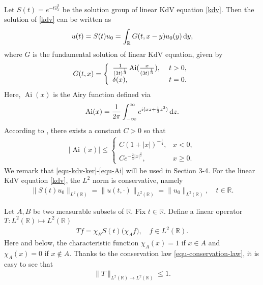 \documentclass[preprint,12pt]{elsarticle}
\def\R {\mathbb{R}}
\def\d{{\,\rm d}}
\begin{document}
Let $S(t)=e^{-t\partial_x^3}$ be the solution group of linear KdV equation \eqref{kdv}. Then the solution of  \eqref{kdv} can be written as
\begin{align}\label{equ-kdv-solu}
u(t)=S(t)u_0=\int_\R G(t,x-y)u_0(y)\d y,
\end{align}
where $G$ is the fundamental solution of linear KdV equation, given by
\begin{align}\label{equ-kdv-ker}
    G(t,x)= \left\{
        \begin{array}{ll}
        \frac{1}{(3t)^{\frac{1}{3}}}\operatorname{Ai}(\frac{x}{(3t)^{\frac{1}{3}}}), & \hbox{ }t> 0, \\
        \delta(x), & \hbox{ }t=0.
        \end{array}
        \right.
\end{align}
Here, $\operatorname{Ai}(x)$ is the Airy function defined via
\begin{align*}
\operatorname{Ai}(x)= \frac{1}{2\pi}\int^{\infty}_{-\infty}e^{i(xz+\frac{1}{3}z^3)}\d z.
\end{align*}
According to \cite[p.330]{stein}, there exists a constant $C>0$ so that
\begin{align}\label{equ-Ai}
|\operatorname{Ai}(x)| \leq
\left\{
\begin{array}{ll}
C(1+|x|)^{-\frac{1}{4}}, &   x<0, \\
 Ce^{-\frac{2}{3}|x|^{\frac{3}{2}}}, &  x\geq 0.
\end{array}
\right.
\end{align}
We remark that \eqref{equ-kdv-ker}-\eqref{equ-Ai} will be used in Section 3-4. For the linear KdV equation \eqref{kdv}, the $L^2$ norm is conservative, namely
\begin{align}\label{equ-conservation-law}
\|S(t)u_0\|_{L^2(\R)}=\|u(t,\cdot)\|_{L^2(\R)}=\|u_0\|_{L^2(\R)}, \quad t\in \R.
\end{align}


Let $A,B$ be two measurable subsets of $\R$. Fix $t\in \R$. Define a linear operator $T:L^2(\R)\mapsto L^2(\R)$
\begin{align}\label{equ-T-def}
Tf = \chi_BS(t)\big( \chi_A f \big), \quad f\in L^2(\R).
\end{align}
Here and below, the characteristic function $\chi_A(x)=1$ if $x\in A$ and $\chi_A(x)=0$ if $x\notin A$. Thanks to the conservation law \eqref{equ-conservation-law}, it is easy to see that
\begin{align}\label{equ-T-norm}
\|T\|_{L^2(\R)\to L^2(\R)}\leq 1.
\end{align}
\end{document}
